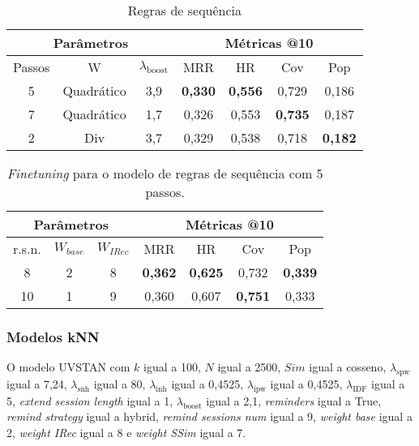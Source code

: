 \begin{table}[htbp]
  \centering
  \begin{tabular}{|c|c|c|c|c|c|c|}
    \hline
      \multicolumn{3}{|c|}{Parâmetros} & \multicolumn{4}{c|}{Métricas @10} \\
      \hline
      Passos & W & $\lambda_{\text{boost}}$ & MRR & HR & Cov & Pop \\
      \hline
      5 & Quadrático & 3,9 & \textbf{0,330} & \textbf{0,556} & 0,729 & 0,186 \\
      \hline
      7 & Quadrático & 1,7 & 0,326 & 0,553 & \textbf{0,735} & 0,187 \\
      \hline
      2 & Div & 3,7 & 0,329 & 0,538 & 0,718 & \textbf{0,182} \\
      \hline
      \end{tabular}
      \caption{Regras de sequência}
      \label{opt:seq_rules}
\end{table}
\begin{table}
  \centering
  \begin{tabular}{|c|c|c|c|c|c|c|}
    \hline
      \multicolumn{3}{|c|}{Parâmetros} & \multicolumn{4}{c|}{Métricas @10} \\
      \hline
      r.s.n. & $W_{base}$ & $W_{IRec}$ & MRR & HR & Cov & Pop \\
      \hline
      8 & 2 & 8 & \textbf{0,362} & \textbf{0,625} & 0,732 & \textbf{0,339} \\
    \hline
     10 & 1 & 9 & 0,360 & 0,607 & \textbf{0,751} & 0,333 \\
     \hline
  \end{tabular}
  \caption{\textit{Finetuning} para o modelo de regras de sequência com 5 passos.}
\end{table}

\subsubsection{Modelos kNN}
O modelo UVSTAN com $k$ igual a 100, $N$ igual a 2500, $Sim$ igual a cosseno,
$\lambda_{\text{spw}}$ igual a 7,24, $\lambda_{\text{snh}}$ igual a 80,
$\lambda_{\text{inh}}$ igual a 0,4525, $\lambda_{\text{ipw}}$ igual a 0,4525,
$\lambda_{\text{IDF}}$ igual a 5, \textit{extend session length} igual a 1,
$\lambda_{\text{boost}}$ igual a 2,1, \textit{reminders} igual a True,
\textit{remind strategy} igual a hybrid, \textit{remind sessions num} igual a 9,
\textit{weight base} igual a 2, \textit{weight IRec} igual a 8 e \textit{weight
SSim} igual a 7.

